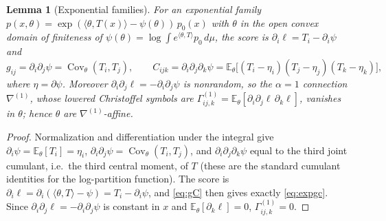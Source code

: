 \documentclass{amsart}
\newtheorem{lemma}{Lemma}
\theoremstyle{definition}
\theoremstyle{remark}
\begin{document}
\begin{lemma}[Exponential families]\label{lem:exp}
For an exponential family $p(x,\theta)=\exp(\langle\theta,T(x)\rangle
-\psi(\theta))\,p_{0}(x)$ with $\theta$ in the open convex domain of finiteness
of $\psi(\theta)=\log\int e^{\langle\theta,T\rangle}p_{0}\,d\mu$, the score is
$\partial_{i}\ell=T_{i}-\partial_{i}\psi$ and
\begin{equation}\label{eq:expgc}
  g_{ij}=\partial_{i}\partial_{j}\psi=\operatorname{Cov}_{\theta}(T_{i},T_{j}),
  \qquad
  C_{ijk}=\partial_{i}\partial_{j}\partial_{k}\psi
   =\mathbb E_{\theta}\!\bigl[(T_{i}-\eta_{i})(T_{j}-\eta_{j})(T_{k}-\eta_{k})\bigr],
\end{equation}
where $\eta=\partial\psi$. Moreover $\partial_{i}\partial_{j}\ell
=-\partial_{i}\partial_{j}\psi$ is nonrandom, so the $\alpha=1$ connection
$\nabla^{(1)}$, whose lowered Christoffel symbols are
$\Gamma^{(1)}_{ij,k}=\mathbb E_{\theta}[\partial_{i}\partial_{j}\ell\,
\partial_{k}\ell]$, vanishes in $\theta$; hence $\theta$ are
$\nabla^{(1)}$-affine.
\end{lemma}

\begin{proof}
Normalization and differentiation under the integral give
$\partial_{i}\psi=\mathbb E_{\theta}[T_{i}]=\eta_{i}$,
$\partial_{i}\partial_{j}\psi=\operatorname{Cov}_{\theta}(T_{i},T_{j})$, and
$\partial_{i}\partial_{j}\partial_{k}\psi$ equal to the third joint cumulant,
i.e.\ the third central moment, of $T$ (these are the standard cumulant
identities for the log-partition function). The score is
$\partial_{i}\ell=\partial_{i}(\langle\theta,T\rangle-\psi)=T_{i}-\partial_{i}\psi$,
and \eqref{eq:gC} then gives exactly \eqref{eq:expgc}. Since
$\partial_{i}\partial_{j}\ell=-\partial_{i}\partial_{j}\psi$ is constant in $x$
and $\mathbb E_{\theta}[\partial_{k}\ell]=0$, $\Gamma^{(1)}_{ij,k}=0$.
\end{proof}
\end{document}
